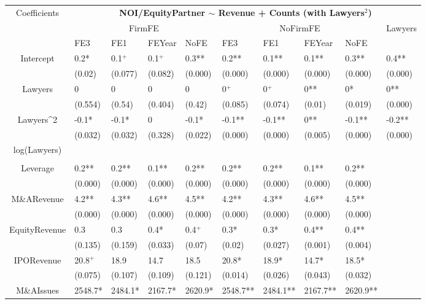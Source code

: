 \documentclass{article}
\begin{document}
\begin{table}[H]
\centering
\begin{tabular}{|clllllllll|}
\hline
\multirow{3}{*}{Coefficients} & \multicolumn{9}{c|}{\textbf{NOI/EquityPartner $\sim$ Revenue + Counts (with Lawyers$^2$)}} \\
\cline{2-10}
& \multicolumn{4}{c}{FirmFE} & \multicolumn{4}{c}{NoFirmFE} & \multirow{2}{*}{Lawyers} \\
\cline{2-9}
& FE3 & FE1 & FEYear & NoFE & FE3 & FE1 & FEYear & NoFE &  \\
\hline
 
Intercept & 0.2* & 0.1$^{+}$ & 0.1$^{+}$ & 0.3** & 0.2** & 0.1** & 0.1** & 0.3** & 0.4** \\ 
   & (0.02) & (0.077) & (0.082) & (0.000) & (0.000) & (0.000) & (0.000) & (0.000) & (0.000) \\ 
  Lawyers & 0 & 0 & 0 & 0 & 0$^{+}$ & 0$^{+}$ & 0** & 0* & 0** \\ 
   & (0.554) & (0.54) & (0.404) & (0.42) & (0.085) & (0.074) & (0.01) & (0.019) & (0.000) \\ 
  Lawyers^2 & -0.1* & -0.1* & 0 & -0.1* & -0.1** & -0.1** & 0** & -0.1** & -0.2** \\ 
   & (0.032) & (0.032) & (0.328) & (0.022) & (0.000) & (0.000) & (0.005) & (0.000) & (0.000) \\ 
  log(Lawyers) &  &  &  &  &  &  &  &  &  \\ 
   &  &  &  &  &  &  &  &  &  \\ 
  Leverage & 0.2** & 0.2** & 0.1** & 0.2** & 0.2** & 0.2** & 0.1** & 0.2** &  \\ 
   & (0.000) & (0.000) & (0.000) & (0.000) & (0.000) & (0.000) & (0.000) & (0.000) &  \\ 
  M\&ARevenue & 4.2** & 4.3** & 4.6** & 4.5** & 4.2** & 4.3** & 4.6** & 4.5** &  \\ 
   & (0.000) & (0.000) & (0.000) & (0.000) & (0.000) & (0.000) & (0.000) & (0.000) &  \\ 
  EquityRevenue & 0.3 & 0.3 & 0.4* & 0.4$^{+}$ & 0.3* & 0.3* & 0.4** & 0.4** &  \\ 
   & (0.135) & (0.159) & (0.033) & (0.07) & (0.02) & (0.027) & (0.001) & (0.004) &  \\ 
  IPORevenue & 20.8$^{+}$ & 18.9 & 14.7 & 18.5 & 20.8* & 18.9* & 14.7* & 18.5* &  \\ 
   & (0.075) & (0.107) & (0.109) & (0.121) & (0.014) & (0.026) & (0.043) & (0.032) &  \\ 
  M\&AIssues & 2548.7* & 2484.1* & 2167.7* & 2620.9* & 2548.7** & 2484.1** & 2167.7** & 2620.9** &  \\ 

\end{tabular}
\end{table}
\end{document}
